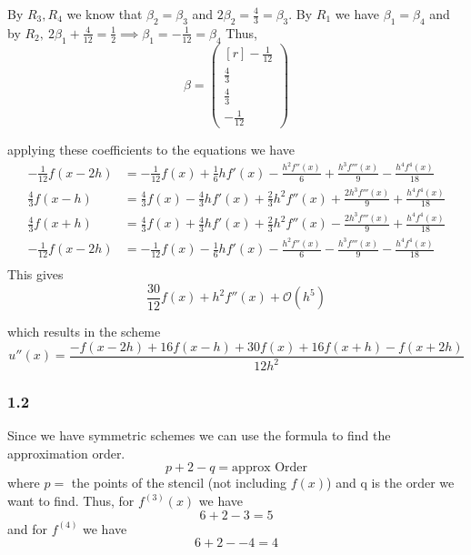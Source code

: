 By $ R_3, R_4 $ we know that $ \beta_2 = \beta_3 $ and $ 2\beta_2 = \frac{ 4 }{ 3 } =
\beta_3 $. By $ R_1 $ we have $ \beta_1 = \beta_4 $ and by $ R_2,\  2\beta_1 + \frac{ 4 }{12 } =
\frac{ 1 }{ 2 } \implies \beta_1 = -\frac{ 1 }{ 12 } = \beta_4$ 
Thus, 
\[
\beta = \begin{pmatrix*}[r]
    - \frac{ 1 }{ 12 }  \\[0.5em]
    \frac{ 4 }{ 3 } \\[0.5em]
    \frac{ 4 }{ 3 } \\[0.5em]
    -\frac{ 1 }{ 12 } 
\end{pmatrix*}

\]

applying these coefficients to the equations we have 
\begin{align*}
     - \frac{ 1 }{ 12 } f(x-2h) &= -\frac{ 1 }{ 12 }  f(x) + \frac{ 1 }{ 6 }hf'(x) - 
     \frac{ h^2f''(x)  }{ 6 } + \frac{ h^3f'''(x)  }{ 9 } -
        \frac{ h^4f^{4}(x)  }{ 18 } \\ 
     \frac{ 4 }{ 3 }    f(x-h) &= \frac{ 4 }{ 3 } f(x) - \frac{ 4 }{ 3 } hf'(x) 
     + \frac{ 2 }{ 3 } h^2f''(x)  +  \frac{ 2h^3f'''(x)  }{ 9 } + \frac{ h^4f^{4}(x)  }{
     18 } \\ 
     \frac{ 4 }{ 3 }    f(x+h) &= \frac{ 4 }{ 3 } f(x) + \frac{ 4 }{ 3 } hf'(x) 
     + \frac{ 2 }{ 3 } h^2f''(x)  -  \frac{ 2h^3f'''(x)  }{ 9 } + \frac{ h^4f^{4}(x)  }{
     18 } \\ 
     - \frac{ 1 }{ 12 } f(x-2h) &= -\frac{ 1 }{ 12 }  f(x) - \frac{ 1 }{ 6 }hf'(x) - 
     \frac{ h^2f''(x)  }{ 6 } - \frac{ h^3f'''(x)  }{ 9 } -
        \frac{ h^4f^{4}(x)  }{ 18 } \\ 
\end{align*}
This gives 
\[
    \frac{ 30 }{ 12 } f(x) + h^2 f''(x) + \mathcal{ O } \left( h^5\right)   
\]

which results in the scheme  
\[
    u''(x) = \frac{ -f(x-2h) + 16f(x-h) + 30f(x) + 16f(x+h) - f(x+2h)     }{ 12h^2 } 
\]

\subsubsection{1.2}
Since we have symmetric schemes we can use the formula to find the approximation order. 
\[
p + 2 - q = \text{approx Order} 
\]
where $ p =  $ the points of the stencil (not including $ f(x)  $) and q is the order we
want to find. Thus, for $ f^{(3)}(x)  $ we have 
\[
6 + 2 - 3 = 5
\]
and for $ f^{(4)}  $ we have 
\[
6 + 2 - - 4 = 4
\]

